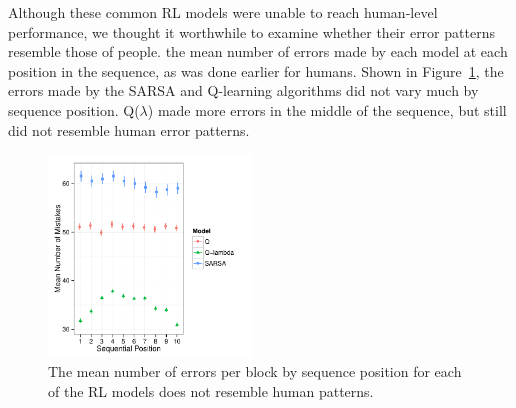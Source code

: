 \documentclass[man,floatsintext]{apa6}
\begin{document}
Although these common RL models were unable to reach human-level performance, we thought it worthwhile to examine whether their error patterns resemble those of people. the mean number of errors made by each model at each position in the sequence, as was done earlier for humans. Shown in Figure~\ref{fig:model-mistakes}, the errors made by the SARSA and Q-learning algorithms did not vary much by sequence position. Q($\lambda$) made more errors in the middle of the sequence, but still did not resemble human error patterns.

\vspace{-.2cm}
\begin{figure}[ht]
  \centering
  \includegraphics[width=0.48\textwidth]{figures/RL500_ModelMistakes_by_seqpos}
  \caption{The mean number of errors per block by sequence position for each of the RL models does not resemble human patterns.}
  \label{fig:model-mistakes}
 \end{figure} 
\end{document}

